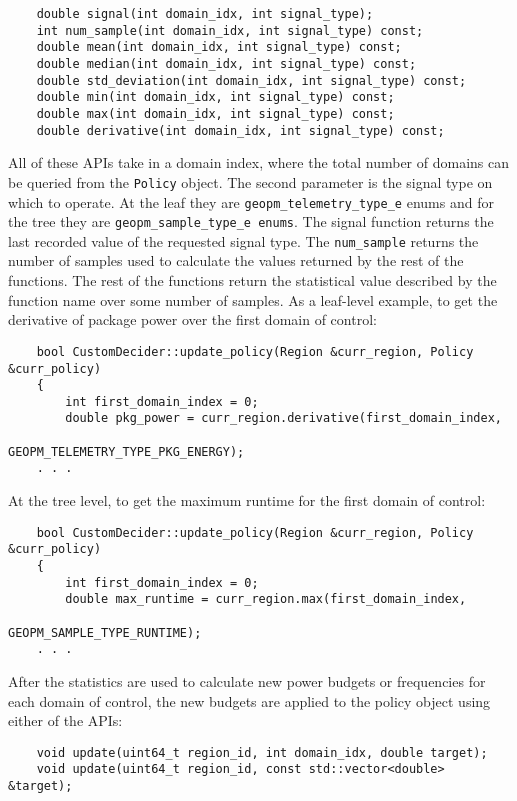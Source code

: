 \documentclass[11pt]{article}
\begin{document}
\begin{verbatim}
    double signal(int domain_idx, int signal_type);
    int num_sample(int domain_idx, int signal_type) const;
    double mean(int domain_idx, int signal_type) const;
    double median(int domain_idx, int signal_type) const;
    double std_deviation(int domain_idx, int signal_type) const;
    double min(int domain_idx, int signal_type) const;
    double max(int domain_idx, int signal_type) const;
    double derivative(int domain_idx, int signal_type) const;
\end{verbatim}
All of these APIs take in a domain index, where the total number of
domains can be queried from the \verb#Policy# object. The second
parameter is the signal type on which to operate. At the leaf they are
\verb#geopm_telemetry_type_e# enums and for the tree they are
\verb#geopm_sample_type_e enums#.  The signal function returns the
last recorded value of the requested signal type.  The
\verb#num_sample# returns the number of samples used to calculate the
values returned by the rest of the functions.  The rest of the
functions return the statistical value described by the function name
over some number of samples.  As a leaf-level example, to get the
derivative of package power over the first domain of control:
\begin{verbatim}
    bool CustomDecider::update_policy(Region &curr_region, Policy &curr_policy)
    {
        int first_domain_index = 0;
        double pkg_power = curr_region.derivative(first_domain_index,
                                                  GEOPM_TELEMETRY_TYPE_PKG_ENERGY);
    . . .
\end{verbatim}
At the tree level, to get the maximum runtime for the first domain of
control:
\begin{verbatim}
    bool CustomDecider::update_policy(Region &curr_region, Policy &curr_policy)
    {
        int first_domain_index = 0;
        double max_runtime = curr_region.max(first_domain_index,
                                             GEOPM_SAMPLE_TYPE_RUNTIME);
    . . .
\end{verbatim}
After the statistics are used to calculate new power budgets or
frequencies for each domain of control, the new budgets are applied to
the policy object using either of the APIs:
\begin{verbatim}
    void update(uint64_t region_id, int domain_idx, double target);
    void update(uint64_t region_id, const std::vector<double> &target);
\end{verbatim}
\end{document}
